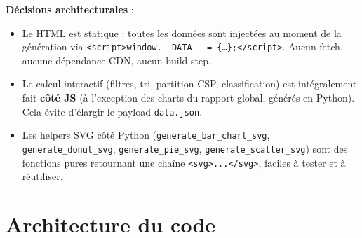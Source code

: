 \documentclass[12pt,a4paper]{article}
\theoremstyle{definition}
\begin{document}
\textbf{Décisions architecturales} :
\begin{itemize}
  \item Le HTML est statique : toutes les données sont injectées au moment de la
    génération via \texttt{<script>window.\_\_DATA\_\_ = \{\ldots\};</script>}. Aucun fetch,
    aucune dépendance CDN, aucun build step.
  \item Le calcul interactif (filtres, tri, partition CSP, classification) est intégralement
    fait \textbf{côté JS} (à l'exception des charts du rapport global, générés en Python).
    Cela évite d'élargir le payload \texttt{data.json}.
  \item Les helpers SVG côté Python (\texttt{generate\_bar\_chart\_svg},
    \texttt{generate\_donut\_svg}, \texttt{generate\_pie\_svg},
    \texttt{generate\_scatter\_svg}) sont des fonctions pures retournant une chaîne
    \texttt{<svg>...</svg>}, faciles à tester et à réutiliser.
\end{itemize}

\section{Architecture du code}
\end{document}
